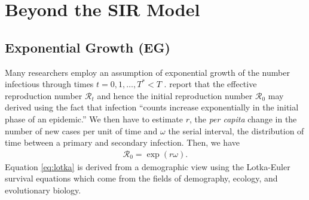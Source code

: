 \documentclass[12pt]{article}
\newcommand{\rr}{\ensuremath{\mathcal{R}_0}}
\begin{document}



\appendix

\section{Beyond the SIR Model}


\subsection{Exponential Growth (EG)}\label{sec:expgrowth}
Many researchers employ an assumption of exponential growth of the number infectious through times $t=0, 1, \dots, T^* <T$ \citep{wallinga2007generation,fisman2014,nishiura2016,majumder2016,towers2016}.
\cite{wallinga2007generation} report that the effective reproduction number $\mathcal{R}_t$ and hence the initial reproduction number $\rr$ may derived using the fact that infection ``counts increase exponentially in the initial phase of an epidemic.''  We then have to estimate $r$, the \textit{per capita} change in the number of new cases per unit of time and $\omega$ the serial interval, the distribution of time between a primary and secondary infection. Then, we have
\begin{align}\label{eq:lotka}
\rr = \exp{(r \omega)}.
\end{align}
Equation \eqref{eq:lotka} is derived from a demographic view using the Lotka-Euler survival equations which come from the fields of demography, ecology, and evolutionary biology.
\end{document}
